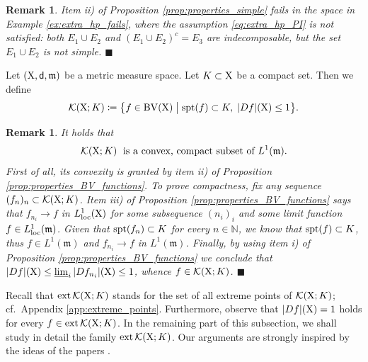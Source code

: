 \documentclass[reqno]{amsart}
\numberwithin{equation}{section}
\newcommand{\N}{\mathbb{N}}
\newcommand{\X}{{\rm X}}
\newcommand{\sfd}{{\sf d}}
\newcommand{\mm}{\mathfrak m}
\newcommand{\1}{\mathbbm 1}
\newcommand{\limi}{\varliminf}
\newcommand{\loc}{{\rm loc}}
\newcommand{\BV}{{\rm BV}}
\newcommand{\fr}{\penalty-20\null\hfill\(\blacksquare\)}
\newtheorem{remark}[theorem]{Remark}
\begin{document}
%
%
\begin{remark}{\rm
Item ii) of Proposition \ref{prop:properties_simple} fails in the space in Example
\ref{ex:extra_hp_fails}, where the assumption \eqref{eq:extra_hp_PI} is not satisfied:
both \(E_1\cup E_2\) and \((E_1\cup E_2)^c=E_3\) are indecomposable, but
the set \(E_1\cup E_2\) is not simple.
\fr}\end{remark}
%
%
Let \((\X,\sfd,\mm)\) be a metric measure space. Let \(K\subset\X\) be a compact set.
Then we define
\[
\mathcal K(\X;K)\coloneqq
\big\{f\in\BV(\X)\;\big|\;{\rm spt}(f)\subset K,\;|Df|(\X)\leq 1\big\}.
\]
%
%
\begin{remark}{\rm
It holds that
\[
\mathcal K(\X;K)\;\text{ is a convex, compact subset of }L^1(\mm).
\]
First of all, its convexity is granted by item ii) of Proposition
\ref{prop:properties_BV_functions}. To prove compactness, fix any
sequence \((f_n)_n\subset\mathcal K(\X;K)\). Item iii) of Proposition
\ref{prop:properties_BV_functions} says that \(f_{n_i}\to f\) in
\(L^1_\loc(\X)\) for some subsequence \((n_i)_i\) and some limit
function \(f\in L^1_\loc(\mm)\). Given that \({\rm spt}(f_n)\subset K\) for
every \(n\in\N\), we know that \({\rm spt}(f)\subset K\),
thus \(f\in L^1(\mm)\) and \(f_{n_i}\to f\) in \(L^1(\mm)\).
Finally, by using item i) of Proposition \ref{prop:properties_BV_functions}
we conclude that \(|Df|(\X)\leq\limi_i|Df_{n_i}|(\X)\leq 1\),
whence \(f\in\mathcal K(\X;K)\).
\fr}\end{remark}
%
%
Recall that \({\rm ext}\,\mathcal K(\X;K)\) stands for the set of all extreme points
of \(\mathcal K(\X;K)\); cf.\ Appendix \ref{app:extreme_points}.
Furthermore, observe that \(|Df|(\X)=1\) holds for
every \(f\in{\rm ext}\,\mathcal K(\X;K)\). In the remaining part of this
subsection, we shall study in detail the family \({\rm ext}\,\mathcal K(\X;K)\).
Our arguments are strongly inspired by the ideas of the papers \cite{Fleming57,Fleming60}.
\bigskip
\end{document}
